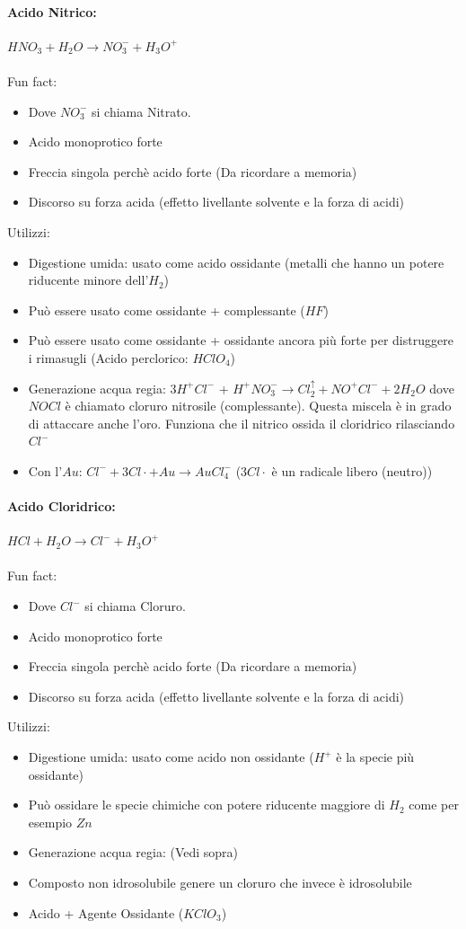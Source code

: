 \documentclass{article}
\begin{document}
\paragraph{Acido Nitrico: } $HNO_3 + H_2O \rightarrow NO_3^- + H_3O^+$ 
\\\\
Fun fact:
\begin{itemize}
	\item Dove $NO_3^-$ si chiama Nitrato.
	\item Acido monoprotico forte
	\item Freccia singola perchè acido forte (Da ricordare a memoria)
	\item Discorso su forza acida (effetto livellante solvente e la forza di acidi)
\end{itemize}
%
Utilizzi:
\begin{itemize}
	\item Digestione umida: usato come acido ossidante (metalli che hanno un potere riducente minore dell'$H_2$)
	\item Può essere usato come ossidante + complessante ($HF$)
	\item Può essere usato come ossidante + ossidante ancora più forte per distruggere i rimasugli (Acido perclorico: $HClO_4$)
	\item Generazione acqua regia: $3H^+Cl^-$ + $H^+NO_3^- \longrightarrow Cl_2^{\uparrow} + NO^+Cl^- + 2H_2O$ dove $NOCl$ è chiamato cloruro nitrosile (complessante). Questa miscela è in grado di attaccare anche l'oro. Funziona che il nitrico ossida il cloridrico rilasciando $Cl^-$ 
	\item Con l'$Au$: $Cl^- + 3Cl\cdot + Au \longrightarrow AuCl_4^-$ ($3Cl\cdot$ è un radicale libero (neutro))
\end{itemize}
\hrulefill
\paragraph{Acido Cloridrico: } $HCl + H_2O \rightarrow Cl^- + H_3O^+$ 
\\\\
Fun fact:
\begin{itemize}
	\item Dove $Cl^-$ si chiama Cloruro.
	\item Acido monoprotico forte
	\item Freccia singola perchè acido forte (Da ricordare a memoria)
	\item Discorso su forza acida (effetto livellante solvente e la forza di acidi)
\end{itemize}
%
Utilizzi:
\begin{itemize}
	\item Digestione umida: usato come acido non ossidante ($H^+$ è la specie più ossidante)
	\item Può ossidare le specie chimiche con potere riducente maggiore di $H_2$ come per esempio $Zn$
	\item Generazione acqua regia: (Vedi sopra)
	\item Composto non idrosolubile genere un cloruro che invece è idrosolubile
	\item Acido + Agente Ossidante ($KClO_3$)
\end{itemize}
\hrulefill
\end{document}
